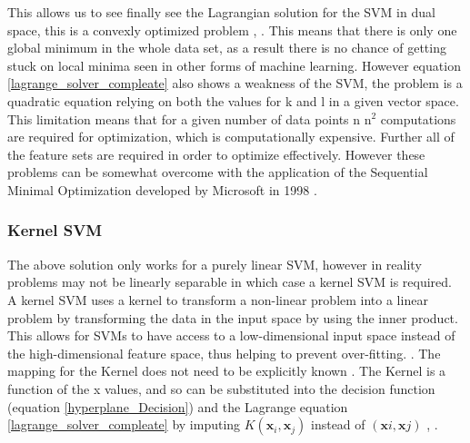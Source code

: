 \documentclass[12pt,a4paper]{article}
\begin{document}
This allows us to see finally see the Lagrangian solution for the SVM in dual space, this is a convexly optimized problem \cite{mitLecture}, \cite{svm_book}. This means that there is only one global minimum in the whole data set, as a result there is no chance of getting stuck on local minima seen in other forms of machine learning. However equation \ref{lagrange_solver_compleate} also shows a weakness of the SVM, the problem is a quadratic equation relying on both the values for k and l in a given vector space. This limitation means that for a given number of data points n n$^2$ computations are required for optimization, which is computationally expensive. Further all of the feature sets are required in order to optimize effectively. However these problems can be somewhat overcome with the application of the Sequential Minimal Optimization developed by Microsoft in 1998 \cite{microsoft_smo}. 

\subsubsection{Kernel SVM}
The above solution only works for a purely linear SVM, however in reality problems may not be linearly separable in which case a kernel SVM is required. A kernel SVM uses a kernel to transform a non-linear problem into a linear problem by transforming the data in the input space by using the inner product. This allows for SVMs to have access to a low-dimensional input space instead of the high-dimensional feature space, thus helping to prevent over-fitting. \cite{svm_book}. The mapping for the Kernel does not need to be explicitly known \cite{svm_book}. The Kernel is a function of the x values, and so can be substituted into the decision function (equation \ref{hyperplane_Decision}) and the Lagrange equation \ref{lagrange_solver_compleate} by imputing $K(\textbf{x}_i,\textbf{x}_j)$ instead of $(\textbf{x}i,\textbf{x}j)$ \cite{kernelSVMs1992}, \cite{mitLecture}. %
\end{document}

